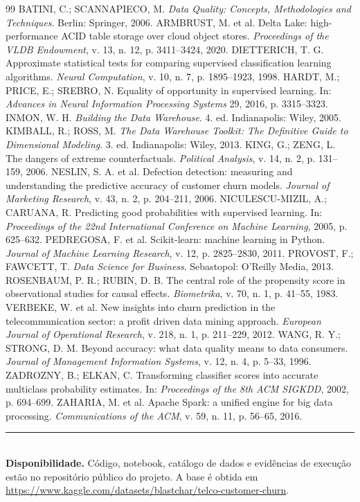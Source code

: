 \documentclass[10pt,a4paper]{article}
\begin{document}
\begin{thebibliography}{99}
\footnotesize\setlength{\itemsep}{0pt}
 BATINI, C.; SCANNAPIECO, M. \emph{Data Quality: Concepts, Methodologies and Techniques}. Berlin: Springer, 2006.
 ARMBRUST, M. et al. Delta Lake: high-performance ACID table storage over cloud object stores. \emph{Proceedings of the VLDB Endowment}, v. 13, n. 12, p. 3411--3424, 2020.
 DIETTERICH, T. G. Approximate statistical tests for comparing supervised classification learning algorithms. \emph{Neural Computation}, v. 10, n. 7, p. 1895--1923, 1998.
 HARDT, M.; PRICE, E.; SREBRO, N. Equality of opportunity in supervised learning. In: \emph{Advances in Neural Information Processing Systems} 29, 2016, p. 3315--3323.
 INMON, W. H. \emph{Building the Data Warehouse}. 4. ed. Indianapolis: Wiley, 2005.
 KIMBALL, R.; ROSS, M. \emph{The Data Warehouse Toolkit: The Definitive Guide to Dimensional Modeling}. 3. ed. Indianapolis: Wiley, 2013.
 KING, G.; ZENG, L. The dangers of extreme counterfactuals. \emph{Political Analysis}, v. 14, n. 2, p. 131--159, 2006.
 NESLIN, S. A. et al. Defection detection: measuring and understanding the predictive accuracy of customer churn models. \emph{Journal of Marketing Research}, v. 43, n. 2, p. 204--211, 2006.
 NICULESCU-MIZIL, A.; CARUANA, R. Predicting good probabilities with supervised learning. In: \emph{Proceedings of the 22nd International Conference on Machine Learning}, 2005, p. 625--632.
 PEDREGOSA, F. et al. Scikit-learn: machine learning in Python. \emph{Journal of Machine Learning Research}, v. 12, p. 2825--2830, 2011.
 PROVOST, F.; FAWCETT, T. \emph{Data Science for Business}. Sebastopol: O'Reilly Media, 2013.
 ROSENBAUM, P. R.; RUBIN, D. B. The central role of the propensity score in observational studies for causal effects. \emph{Biometrika}, v. 70, n. 1, p. 41--55, 1983.
 VERBEKE, W. et al. New insights into churn prediction in the telecommunication sector: a profit driven data mining approach. \emph{European Journal of Operational Research}, v. 218, n. 1, p. 211--229, 2012.
 WANG, R. Y.; STRONG, D. M. Beyond accuracy: what data quality means to data consumers. \emph{Journal of Management Information Systems}, v. 12, n. 4, p. 5--33, 1996.
 ZADROZNY, B.; ELKAN, C. Transforming classifier scores into accurate multiclass probability estimates. In: \emph{Proceedings of the 8th ACM SIGKDD}, 2002, p. 694--699.
 ZAHARIA, M. et al. Apache Spark: a unified engine for big data processing. \emph{Communications of the ACM}, v. 59, n. 11, p. 56--65, 2016.
\end{thebibliography}

\vspace{4pt}
\noindent\rule{\textwidth}{0.4pt}\\
\footnotesize
\textbf{Disponibilidade.} Código, notebook, catálogo de dados e evidências de execução
estão no repositório público do projeto. A base é obtida em
\url{https://www.kaggle.com/datasets/blastchar/telco-customer-churn}.
\end{document}

